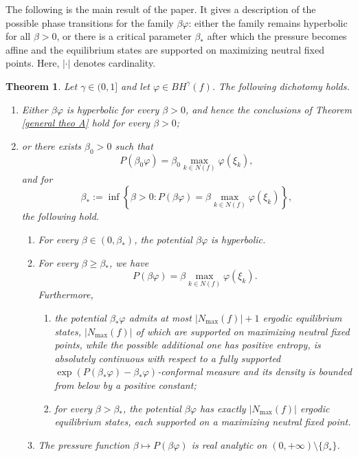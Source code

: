 \documentclass[12pt]{amsart}
\numberwithin{equation}{section} %
\numberwithin{figure}{section} %
\theoremstyle{plain}
\newtheorem{theoalph}{Theorem}
\theoremstyle{definition}
\theoremstyle{remark}
\theoremstyle{citing}
\renewcommand{\=}{\coloneqq}
\newcommand{\Nmax}{N_\text{max}(f)}
\begin{document}
The following is the main result of the paper. It gives a description of the possible phase transitions for the family $\beta \varphi$: either the family remains hyperbolic for all $\beta>0$, or there is a critical parameter $\beta_{*}$ after which the pressure becomes affine and the equilibrium states are supported on maximizing neutral fixed points. Here, $|\cdot|$ denotes cardinality.

\begin{theoalph}\label{Theo A}
Let $\gamma\in(0,1]$ and let $\varphi\in BH^\gamma(f)$. The following dichotomy holds.
\begin{enumerate}
    \item[1.] Either $\beta\varphi$ is hyperbolic for every $\beta>0$, and hence the conclusions of Theorem \ref{general theo A} hold for every $\beta>0$;

    \item[2.] or there exists $\beta_0>0$ such that
    \[
    P(\beta_0\varphi)=\beta_0\max_{k\in N(f)}\varphi(\xi_k),
    \]
    and for
    \begin{equation}\label{eq 1 thm C}
        \beta_* := \inf\left\{\beta>0: P(\beta\varphi) = \beta\max_{k\in N(f)}\varphi(\xi_k)\right\},
    \end{equation}
    the following hold.
    \begin{enumerate}
        \item[(a)] For every $\beta\in(0,\beta_*)$, the potential $\beta\varphi$ is hyperbolic.

        \item[(b)] For every $\beta\geq \beta_*$, we have
        \begin{equation}\label{eq 2 thm 1}
            P(\beta\varphi)=\beta\max_{k\in N(f)}\varphi(\xi_k).
        \end{equation}
        Furthermore,
        \begin{enumerate}
            \item[(i)] the potential $\beta_*\varphi$ admits at most $|\Nmax|+1$ ergodic equilibrium states, $|\Nmax|$ of which are supported on maximizing neutral fixed points, while the possible additional one has positive entropy, is absolutely continuous with respect to a fully supported $\exp(P(\beta_*\varphi)-\beta_{*}\varphi)$-conformal measure and its density is bounded from below by a positive constant;

            \item[(ii)] for every $\beta>\beta_*$, the potential $\beta\varphi$ has exactly $|\Nmax|$ ergodic equilibrium states, each supported on a maximizing neutral fixed point.
        \end{enumerate}

        \item[(c)] The pressure function $\beta\mapsto P(\beta\varphi)$ is real analytic on $(0,+\infty)\setminus\{\beta_*\}$.
    \end{enumerate}
\end{enumerate}
\end{theoalph}
\end{document}
